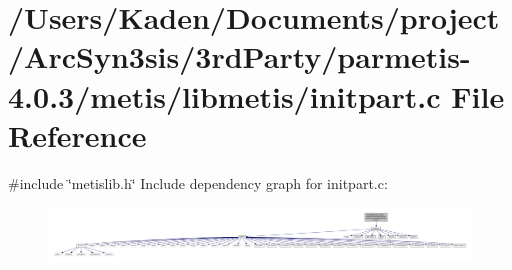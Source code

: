 \hypertarget{a00903}{}\section{/\+Users/\+Kaden/\+Documents/project/\+Arc\+Syn3sis/3rd\+Party/parmetis-\/4.0.3/metis/libmetis/initpart.c File Reference}
\label{a00903}
{\ttfamily \#include \char`\"{}metislib.\+h\char`\"{}}\newline
Include dependency graph for initpart.\+c\+:\nopagebreak
\begin{figure}[H]
\begin{center}
\leavevmode
\includegraphics[width=350pt]{a00904}
\end{center}
\end{figure}

